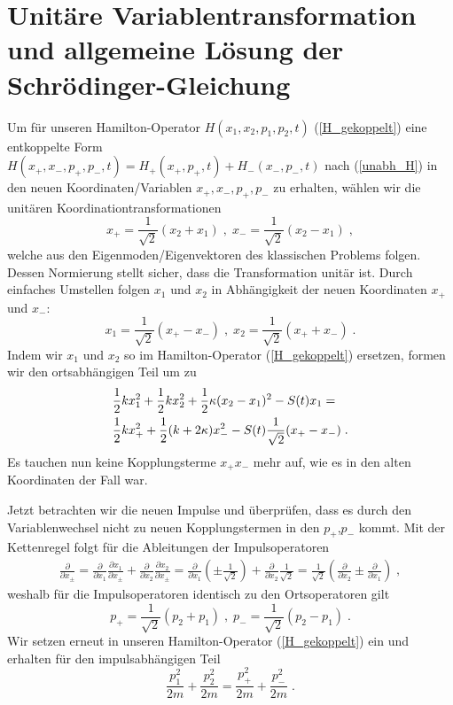 \section{Unitäre Variablentransformation und allgemeine Lösung der Schrödinger-Gleichung}
  Um für unseren Hamilton-Operator $H(x_1,x_2,p_1,p_2,t)$ (\ref{H_gekoppelt}) eine entkoppelte Form \\
  $H(x_+,x_-,p_+,p_-,t)=H_+(x_+,p_+,t)+H_-(x_-,p_-,t)$ nach (\ref{unabh_H}) in den neuen Koordinaten/Variablen $x_+,x_-,p_+,p_-$ zu erhalten, wählen wir die unitären Koordinationtransformationen~\cite{arxiv}
  \begin{equation}
    x_+ = \frac{1}{\sqrt{2}}(x_2+x_1) \;,\; x_-=\frac{1}{\sqrt{2}}(x_2-x_1) \;,
    \label{koord_trafo_x}
  \end{equation}
  welche aus den Eigenmoden/Eigenvektoren des klassischen Problems folgen.
  Dessen Normierung stellt sicher, dass die Transformation unitär ist.
  Durch einfaches Umstellen folgen $x_1$ und $x_2$ in Abhängigkeit der neuen Koordinaten $x_+$ und $x_-$:
  \begin{equation}
    x_1=\frac{1}{\sqrt{2}}(x_+-x_-) \;,\; x_2=\frac{1}{\sqrt{2}}(x_++x_-) \; .
  \end{equation}
  Indem wir $x_1$ und $x_2$ so im Hamilton-Operator (\ref{H_gekoppelt}) ersetzen, formen wir den ortsabhängigen Teil um zu
  \begin{align}
    &\frac{1}{2}kx_1^2+\frac{1}{2}kx_2^2+\frac{1}{2}\kappa(x_2-x_1)^2-S(t)x_1= \notag\\
    &\frac{1}{2}kx_+^2+\frac{1}{2}(k+2\kappa)x_-^2-S(t)\frac{1}{\sqrt{2}}(x_+-x_-) \; .
  \end{align}
  Es tauchen nun keine Kopplungsterme $x_+x_-$ mehr auf, wie es in den alten Koordinaten der Fall war.

  Jetzt betrachten wir die neuen Impulse und überprüfen, dass es durch den Variablenwechsel nicht zu neuen Kopplungstermen in den $p_+$,$p_-$ kommt.
  Mit der Kettenregel folgt für die Ableitungen der Impulsoperatoren
  \begin{align}
    \frac{\partial}{\partial x_{\pm}} = \frac{\partial}{\partial x_1}\frac{\partial x_1}{\partial x_{\pm}} + \frac{\partial}{\partial x_2}\frac{\partial x_2}{\partial x_{\pm}}
    =\frac{\partial}{\partial x_1}\left(\pm\frac{1}{\sqrt{2}}\right)
    + \frac{\partial}{\partial x_2}\frac{1}{\sqrt{2}}
    = \frac{1}{\sqrt{2}}\left(\frac{\partial}{\partial x_2}\pm\frac{\partial}{\partial  x_1}\right) \;,
  \end{align}
  weshalb für die Impulsoperatoren identisch zu den Ortsoperatoren gilt
  \begin{equation}
    p_+ = \frac{1}{\sqrt{2}}(p_2+p_1) \;,\; p_-=\frac{1}{\sqrt{2}}(p_2-p_1) \; .
    \label{koord_trafo_p}
  \end{equation}
  Wir setzen erneut in unseren Hamilton-Operator (\ref{H_gekoppelt}) ein und erhalten für den impulsabhängigen Teil
  \begin{equation}
    \frac{p_1^2}{2m} + \frac{p_2^2}{2m} = \frac{p_+^2}{2m} + \frac{p_-^2}{2m} \; .
    \label{koord_trafo_p^2}
  \end{equation}

